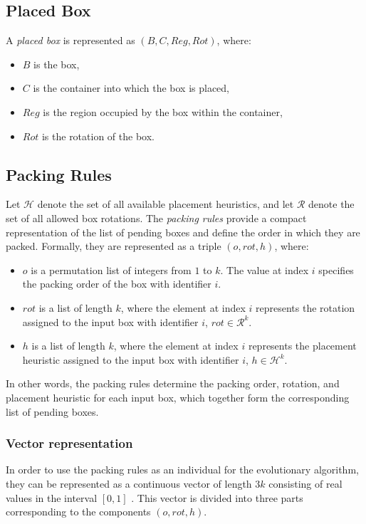\subsection{Placed Box}

A \emph{placed box} is represented as $(B, C, Reg, Rot)$, where:
\begin{itemize}
    \item $B$ is the box,
    \item $C$ is the container into which the box is placed,
    \item $Reg$ is the region occupied by the box within the container,
    \item $Rot$ is the rotation of the box.
\end{itemize}



\subsection{Packing Rules}

Let $\mathcal{H}$ denote the set of all available placement heuristics, and let $\mathcal{R}$ denote the set of all allowed box rotations.
The \emph{packing rules} provide a compact representation of the list of pending boxes and define the order in which they are packed. 
Formally, they are represented as a triple $(o, rot, h)$, where:
\begin{itemize}
    \item $o$ is a permutation list of integers from $1$ to $k$. 
    The value at index $i$ specifies the packing order of the box with identifier $i$.
    \item $rot$ is a list of length $k$, where the element at index $i$ represents the rotation assigned to the input box with identifier $i$, $rot \in \mathcal{R}^k$.
    \item $h$ is a list of length $k$, where the element at index $i$ represents the placement heuristic assigned to the input box with identifier $i$, $h \in \mathcal{H}^k$.
\end{itemize}
In other words, the packing rules determine the packing order, rotation, and placement heuristic for each input box, which together form the corresponding list of pending boxes.

\subsubsection{Vector representation}
In order to use the packing rules as an individual for the evolutionary algorithm, they can be represented as a continuous vector of length $3k$ consisting of real values in the interval $[0,1]$ \cite{goncalves2013}.
This vector is divided into three parts corresponding to the components $(o, rot, h)$.

